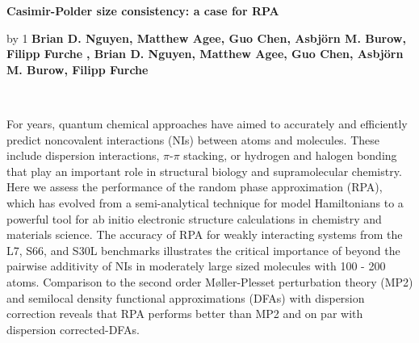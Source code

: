 \documentclass[12pt]{scrartcl}
\newcommand{\Title}[1]{
   \begin{center}
      \large{
         \textbf{
            #1
            \vspace{1.0\baselineskip}
         }
      }
   \end{center}
}
\newcommand{\AddAuthor}[2]{%
   \advance\numauthors by 1%
   \large{%
      \ifnum\numauthors=1%
         \textbf{#1}\textsuperscript{#2}%
      \else%
         \textbf{, #1}\textsuperscript{#2}%
      \fi%
   }%
}%
\newenvironment{Authors}{
   \begin{center}
}{
   \end{center}
}
\newenvironment{Address}{
   \begin{center}
}{
   \end{center}
}
\newenvironment{Abstract}{
   {~}
   \vspace{
      \baselineskip
   }
   \newline{}
   \normalsize
}{
}
\begin{document}
\Title{Casimir-Polder size consistency: a case for RPA}

\begin{Authors}
   \AddAuthor{\normalfont \normalsize Brian
     D. Nguyen, Matthew Agee, Guo Chen, Asbjörn M. Burow,
     Filipp Furche}{}%
\end{Authors}
%
\begin{Address}
\end{Address}

\begin{Abstract}

For years, quantum chemical approaches have aimed to accurately and
efficiently predict noncovalent interactions (NIs) between atoms
and molecules. These include dispersion interactions, $\pi$-$\pi$
stacking, or hydrogen and halogen bonding that play an important
role in structural biology and supramolecular chemistry. Here we
assess the performance of the random phase approximation (RPA),
which has evolved from a semi-analytical technique for model
Hamiltonians to a powerful tool for ab initio electronic structure
calculations in chemistry and materials science. The accuracy of
RPA for weakly interacting systems from the L7, S66, and S30L benchmarks
illustrates the critical importance of beyond the pairwise additivity of
NIs in moderately large sized molecules with 100 - 200 atoms. Comparison
to the second order M{\o}ller-Plesset perturbation theory (MP2) and
semilocal density functional approximations (DFAs) with dispersion
correction reveals that RPA performs better than MP2 and on par with
dispersion corrected-DFAs.



\end{Abstract}
\end{document}
